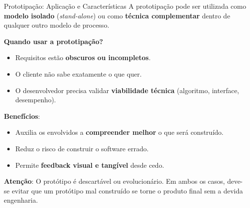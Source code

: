 \documentclass[9pt]{beamer}
\begin{document}
\begin{frame}{Prototipação: Aplicação e Características}
  A prototipação pode ser utilizada como \textbf{modelo isolado} (\textit{stand-alone}) ou como \textbf{técnica complementar} dentro de qualquer outro modelo de processo.

  \vspace{0.3cm}
  \textbf{Quando usar a prototipação?}
  \begin{itemize}
    \item Requisitos estão \textbf{obscuros ou incompletos}.
    \item O cliente não sabe exatamente o que quer.
    \item O desenvolvedor precisa validar \textbf{viabilidade técnica} (algoritmo, interface, desempenho).
  \end{itemize}

  \vspace{0.3cm}
  \textbf{Benefícios}:
  \begin{itemize}
    \item Auxilia os envolvidos a \textbf{compreender melhor} o que será construído.
    \item Reduz o risco de construir o software errado.
    \item Permite \textbf{feedback visual e tangível} desde cedo.
  \end{itemize}

  \vspace{0.3cm}
  \centering
  \colorbox{yellow!12}{
    \parbox{0.9\textwidth}{
      \scriptsize
      \textbf{Atenção}: O protótipo é descartável ou evolucionário. Em ambos os casos, deve-se evitar que um protótipo mal construído se torne o produto final sem a devida engenharia.
    }
  }
\end{frame}

\end{document}
